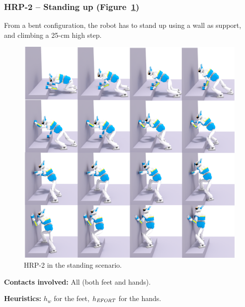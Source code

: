 \documentclass[journal]{IEEEtran}
\newcommand{\commentt}[2]{\textcolor{#1}{\textbf{\textit{[#2]}}}} 	%
\newcommand{\adnote}[1]{\commentt{blue}{AD: #1}}
\newcommand{\gls}[1]{\textit{#1}}
\providecommand{\DIFdelend}{} %
\begin{document}
\DIFdelend \subsubsection{HRP-2 -- Standing up (Figure~\ref{fig:standing})}
From a bent configuration, the robot has to stand up using a wall as support, and climbing a 25-cm high step.

\begin{figure}
  \centering
  \includegraphics[width=1\linewidth]{figures/standing}
  \caption{
           HRP-2 in the standing scenario. }
		   \label{fig:standing}
\end{figure}


\noindent\textbf{Contacts involved:} All (both feet and hands).

\noindent\textbf{Heuristics:} $h_w$ for the feet, $h_{\textrm{\it EFORT}}$  for the hands.

\end{document}
